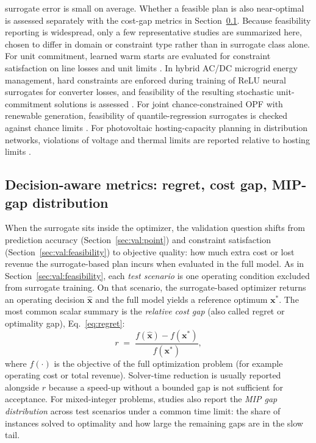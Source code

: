 surrogate error is small on average. Whether a feasible plan is also
near-optimal is assessed separately with the cost-gap metrics in
Section~\ref{sec:val:decision}. Because feasibility reporting is
widespread, only a few representative studies are summarized here,
chosen to differ in domain or constraint type rather than in surrogate
class alone. For unit commitment, learned warm starts are evaluated for
constraint satisfaction on line losses and unit limits
\cite{Chen2022}. In hybrid AC/DC microgrid energy management, hard
constraints are enforced during training of ReLU neural surrogates for
converter losses, and feasibility of the resulting stochastic unit-
commitment solutions is assessed \cite{Liu20242534}. For joint
chance-constrained OPF with renewable generation, feasibility of
quantile-regression surrogates is checked against chance limits
\cite{Chen2023657}. For photovoltaic hosting-capacity planning in
distribution networks, violations of voltage and thermal limits are
reported relative to hosting limits \cite{Koirala20242284}.

\subsection{Decision-aware metrics: regret, cost gap, MIP-gap distribution}
\label{sec:val:decision}

When the surrogate sits inside the optimizer, the validation question
shifts from prediction accuracy (Section~\ref{sec:val:point}) and
constraint satisfaction (Section~\ref{sec:val:feasibility}) to
objective quality: how much extra cost or lost revenue the
surrogate-based plan incurs when evaluated in the full model. As in
Section~\ref{sec:val:feasibility}, each \emph{test scenario} is one
operating condition excluded from surrogate training. On that scenario,
the surrogate-based optimizer returns an operating decision
$\hat{\mathbf{x}}$ and the full model yields a reference optimum
$\mathbf{x}^{*}$. The most common scalar summary is the \emph{relative
cost gap} (also called regret or optimality gap),
Eq.~\eqref{eq:regret}:
\begin{equation}
  r \;=\; \frac{f(\hat{\mathbf{x}}) - f(\mathbf{x}^{*})}{f(\mathbf{x}^{*})},
  \label{eq:regret}
\end{equation}
where $f(\cdot)$ is the objective of the full optimization problem
(for example operating cost or total revenue). Solver-time reduction is
usually reported alongside $r$ because a speed-up without a bounded gap
is not sufficient for acceptance. For mixed-integer problems, studies
also report the \emph{MIP gap distribution} across test scenarios under
a common time limit: the share of instances solved to optimality and
how large the remaining gaps are in the slow tail.

